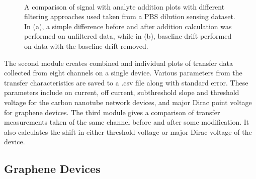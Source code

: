 \documentclass[
  a4paper,
]{scrbook}
\begin{document}
\begin{figure}
\begin{minipage}[t]{0.70\linewidth}
{{}

}

\end{minipage}%
%
\begin{minipage}[t]{0.15\linewidth}

{\centering 

~

}

\end{minipage}%

\caption[A comparison of signal with analyte addition plots with
different filtering approaches used.]{\label{fig-spaa-plot-comparison}A
comparison of signal with analyte addition plots with different
filtering approaches used taken from a PBS dilution sensing dataset. In
(a), a simple difference before and after addition calculation was
performed on unfiltered data, while in (b), baseline drift performed on
data with the baseline drift removed.}

\end{figure}

The second module creates combined and individual plots of transfer data
collected from eight channels on a single device. Various parameters
from the transfer characteristics are saved to a .csv file along with
standard error. These parameters include on current, off current,
subthreshold slope and threshold voltage for the carbon nanotube network
devices, and major Dirac point voltage for graphene devices. The third
module gives a comparison of transfer measurements taken of the same
channel before and after some modification. It also calculates the shift
in either threshold voltage or major Dirac voltage of the device.

\hypertarget{graphene-devices}{%
\subsection{Graphene Devices}\label{graphene-devices}}
\end{document}
